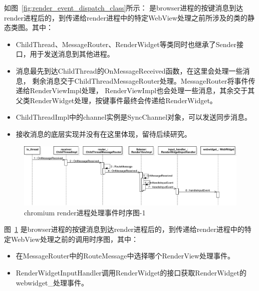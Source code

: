 如图~\ref{fig:render_event_dispatch_class}所示：
是browser进程的按键消息到达render进程后的，到传递给render进程中的特定WebView处理之前所涉及的类的静态类图。其中：
\begin{itemize}
  \item ChildThread、MessageRouter、RenderWidget等类同时也继承了Sender接口，用于发送消息到其他进程。
  \item 消息最先到达ChildThread的OnMessageReceived函数，在这里会处理一些消息，
  剩余消息交于ChildThreadMessageRouter处理。MessageRouter将事件传递给RenderViewImpl处理，
  RenderViewImpl也会处理一些消息，其余交于其父类RenderWidget处理，按键事件最终会传递给RenderWidget。
  \item ChildThreadImpl中的channel实例是SyncChannel对象，可以发送同步消息。
  \item 接收消息的底层实现并没有在这里体现，留待后续研究。
\end{itemize}

\newpage
\begin{figure}[H] 
  \centering 
  \includegraphics[width=\textwidth]{image/event_study/render_event_dispatch_sequence.pdf} 
  \caption{chromium render进程处理事件时序图-1} \label{fig:render_event_dispatch_sequence} 
\end{figure}

图~\ref{fig:render_event_dispatch_sequence}
是browser进程的按键消息到达render进程后的，到传递给render进程中的特定WebView处理之前的调用时序图，其中：

\begin{itemize}
  \item 在MessageRouter中的RouteMessage中选择哪个RenderView处理事件。
  \item RenderWidgetInputHandler调用RenderWidget的接口获取RenderWidget的webwidget\_处理事件。
\end{itemize}

